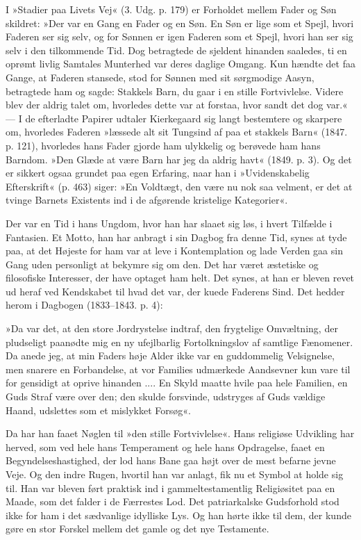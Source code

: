 \documentclass[12pt,a4paper,openany]{book}
\newcommand{\opage}[1]{\marginnote{\footnotesize\textit{[#1]}}}
\begin{document}
I »Stadier paa Livets Vej« (3. Udg. p. 179) er Forholdet
mellem Fader og Søn skildret: »Der var en Gang
en Fader og en Søn. En Søn er lige som et Spejl,
hvori Faderen ser sig selv, og for Sønnen er igen
Faderen som et Spejl, hvori han ser sig selv i den tilkommende
Tid. Dog betragtede de sjeldent hinanden
saaledes, ti en oprømt livlig Samtales Munterhed var
deres daglige Omgang. Kun hændte det faa Gange, at
Faderen stansede, stod for Sønnen med sit sørgmodige
Aasyn, betragtede ham og sagde: Stakkels Barn, du
gaar i en stille Fortvivlelse. Videre blev der aldrig
talet om, hvorledes dette var at forstaa, hvor sandt det
dog var.« --- I de efterladte Papirer udtaler Kierkegaard
sig langt bestemtere og skarpere om, hvorledes Faderen
»læssede alt sit Tungsind af paa et stakkels Barn«
(1847. p. 121), hvorledes hans Fader gjorde ham ulykkelig
og berøvede ham hans Barndom. »Den Glæde at
være Barn har jeg da aldrig havt« (1849. p. 3). Og
det er sikkert ogsaa grundet paa egen Erfaring, naar
\opage{36}han i »Uvidenskabelig Efterskrift« (p. 463) siger: »En
Voldtægt, den være nu nok saa velment, er det at tvinge
Barnets Existents ind i de afgørende kristelige Kategorier«.

Der var en Tid i hans Ungdom, hvor han har slaaet
sig løs, i hvert Tilfælde i Fantasien. Et Motto, han har
anbragt i sin Dagbog fra denne Tid, synes at tyde paa,
at det Højeste for ham var at leve i Kontemplation og
lade Verden gaa sin Gang uden personligt at bekymre
sig om den. Det har været æstetiske og filosofiske
Interesser, der have optaget ham helt. Det synes, at
han er bleven revet ud heraf ved Kendskabet til hvad
det var, der kuede Faderens Sind. Det hedder herom i
Dagbogen (1833--1843. p. 4):

»Da var det, at den store Jordrystelse indtraf, den
frygtelige Omvæltning, der pludseligt paanødte mig en
ny ufejlbarlig Fortolkningslov af samtlige Fænomener.
Da anede jeg, at min Faders høje Alder ikke var en
guddommelig Velsignelse, men snarere en Forbandelse,
at vor Families udmærkede Aandsevner kun vare til for
gensidigt at oprive hinanden .... En Skyld maatte hvile
paa hele Familien, en Guds Straf være over den; den
skulde forsvinde, udstryges af Guds vældige Haand, udslettes
som et mislykket Forsøg«.

Da har han faaet Nøglen til »den stille Fortvivlelse«.
Hans religiøse Udvikling har herved, som ved hele hans
Temperament og hele hans Opdragelse, faaet en Begyndelseshastighed,
der lod hans Bane gaa højt over de
mest befarne jevne Veje. Og den indre Rugen, hvortil
han var anlagt, fik nu et Symbol at holde sig til. Han var
bleven ført praktisk ind i gammeltestamentlig Religiøsitet
paa en Maade, som det falder i de Færrestes Lod. Det
patriarkalske Gudsforhold stod ikke for ham i det sædvanlige
idylliske Lys. Og han hørte ikke til dem, der
\opage{37}kunde gøre en stor Forskel mellem det gamle og det nye
Testamente.
\end{document}
